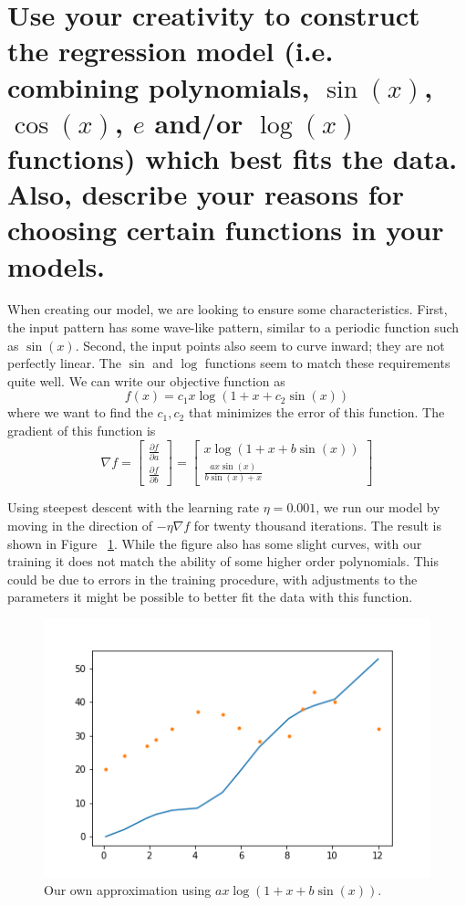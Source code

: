 \documentclass[11pt,margin=1in]{scrartcl}
\begin{document}
\section{Use your creativity to construct the regression model (i.e. combining polynomials, $\sin(x)$, $\cos(x)$, $e$ and/or $\log(x)$ functions) which 
best fits the data. Also, describe your reasons for choosing certain functions in your models.}
When creating our model, we are looking to ensure some characteristics.
First, the input pattern has some wave-like pattern, similar to a periodic function such as $\sin(x)$.
Second, the input points also seem to curve inward; they are not perfectly linear.
The $\sin$ and $\log$ functions seem to match these requirements quite well.
We can write our objective function as 
\begin{equation}
	f(x) = c_1x\log(1 + x + c_2\sin(x))
\end{equation}
where we want to find the $c_1, c_2$ that minimizes the error of this function.
The gradient of this function is 
\begin{equation}
	\nabla f =
	\begin{bmatrix}
		\frac{\partial f}{\partial a} \\
		\frac{\partial f}{\partial b}	
	\end{bmatrix}
	=
	\begin{bmatrix}
			x\log(1 + x + b\sin(x))	 \\
			\frac{ax\sin(x)}{b\sin(x) + x}
	\end{bmatrix}
\end{equation}

Using steepest descent with the learning rate $\eta = 0.001$, we run our model by moving in the direction of $-\eta\nabla f$ for twenty thousand 
iterations.
The result is shown in Figure ~\ref{fig:p4OwnModel}.
While the figure also has some slight curves, with our training it does not match the ability of some higher order polynomials.
This could be due to errors in the training procedure, with adjustments to the parameters it might be possible to better fit the data
with this function.
\begin{figure}
	\centering
	\includegraphics[scale=0.5]{p4OwnModel}
	\caption{Our own approximation using $ax\log(1 + x + b\sin(x))$.}
	\label{fig:p4OwnModel}
\end{figure}
\end{document}
